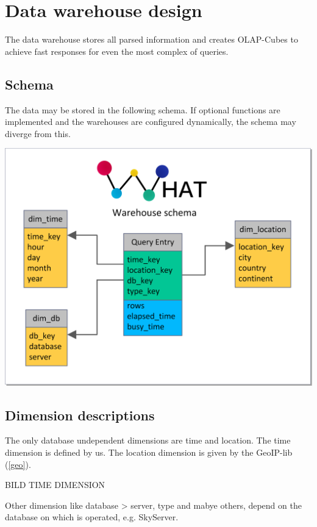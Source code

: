 \section{Data warehouse design}

The data warehouse stores all parsed information and creates OLAP-Cubes to achieve fast responses 
for even the most complex of queries.

\subsection{Schema}
The data may be stored in the following schema. If optional functions are implemented and
the warehouses are configured dynamically, the schema may diverge from this.
\begin{center}
\includegraphics[width=1\linewidth]{Pictures/WHSchema2.png}
\end{center} 


\subsection{Dimension descriptions}
 The only database undependent dimensions are time and location. The time dimension is defined by us. The location 
 dimension is given by the GeoIP-lib (\ref{geo}).
 
 BILD TIME DIMENSION

Other dimension like database > server, type and mabye others, 
depend on the database on which is operated, e.g. SkyServer.


